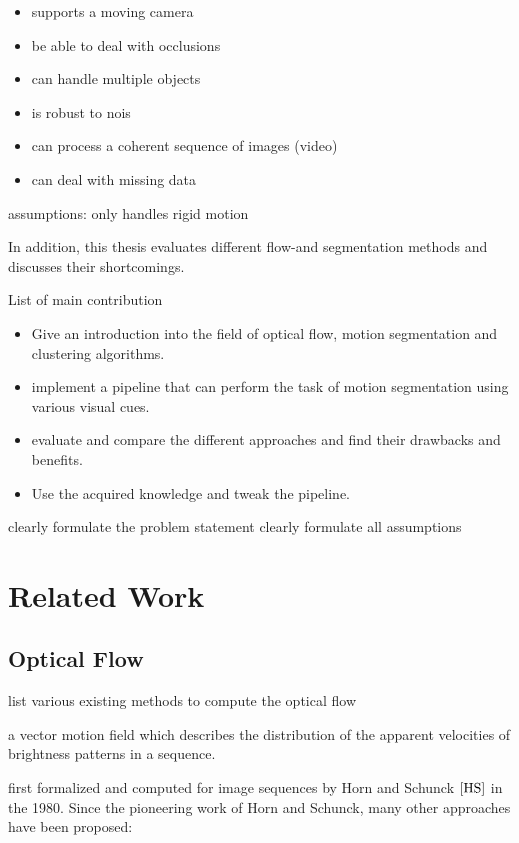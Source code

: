 \begin{itemize}
  \item supports a moving camera
  \item be able to deal with occlusions
  \item can handle multiple objects
  \item is robust to nois
  \item can process a coherent sequence of images (video)
  \item can deal with missing data
\end{itemize}

assumptions: only handles rigid motion
 
In addition, this thesis evaluates different flow-and segmentation methods and discusses their shortcomings.

List of main contribution

\begin{itemize}
  \item Give an introduction into the field of optical flow, motion segmentation and clustering algorithms.
  \item implement a pipeline that can perform the task of motion segmentation using various visual cues.
  \item evaluate and compare the different approaches and find their drawbacks and benefits.
  \item Use the acquired knowledge and tweak the pipeline.
\end{itemize}


clearly formulate the problem statement
clearly formulate all assumptions

\section{Related Work}

\subsection{Optical Flow}
list various existing methods to compute the optical flow

a vector motion field which describes the distribution of the apparent velocities of brightness patterns in a sequence. 

first formalized and computed  for  image  sequences  by  Horn  and  Schunck $\cite{HS}$ in  the  1980. Since the pioneering work of Horn and Schunck, many other approaches have been proposed:

